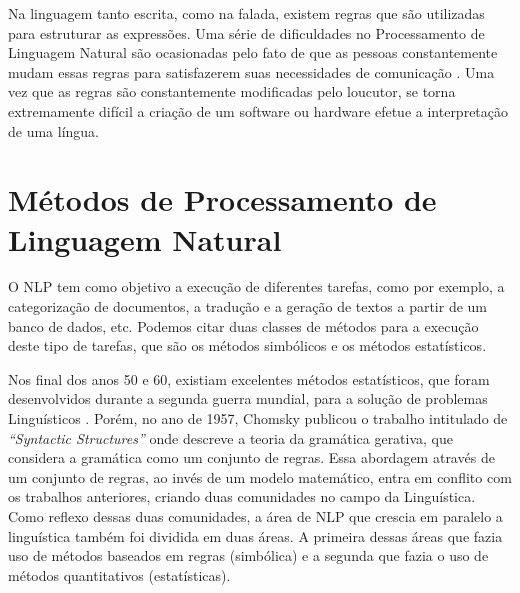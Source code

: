 Na linguagem tanto escrita, como na falada, existem regras que são utilizadas
para estruturar as expressões. Uma série de dificuldades no Processamento de
Linguagem Natural são ocasionadas pelo fato de que as pessoas constantemente
mudam essas regras para satisfazerem suas necessidades de comunicação
\cite{manningschutze1999}. Uma vez que as regras são constantemente modificadas pelo loucutor, se torna extremamente difícil a criação de um software ou hardware efetue a interpretação de uma língua.


%
%
%

\section{Métodos de Processamento de Linguagem Natural}

O \ac{NLP} tem como objetivo a execução de diferentes tarefas, como por exemplo,
a categorização de documentos, a tradução e a geração de textos a partir de um
banco de dados, etc. Podemos citar duas classes de métodos para a execução deste
tipo de tarefas, que são os métodos simbólicos e os métodos estatísticos.

Nos final dos anos 50 e 60, existiam excelentes métodos estatísticos, que foram
desenvolvidos durante a segunda guerra mundial, para a solução de problemas
Linguísticos \cite{shannon48}.
Porém, no ano de 1957, Chomsky publicou o trabalho intitulado de
\textit{``Syntactic Structures''} onde descreve a
teoria da gramática gerativa, que considera a gramática como um conjunto de regras. Essa abordagem através de um
conjunto de regras, ao invés de um modelo matemático, entra em conflito com os
trabalhos anteriores, criando duas comunidades no campo da Linguística. Como
reflexo dessas duas comunidades, a área de \ac{NLP} que crescia em paralelo a
linguística também foi dividida em duas áreas. A primeira dessas áreas que fazia
uso de métodos baseados em regras (simbólica) e a segunda que fazia o uso de
métodos quantitativos (estatísticas).


